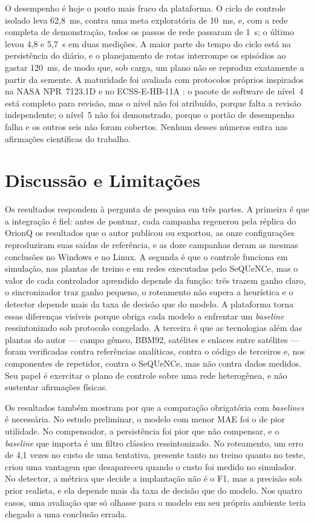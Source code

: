 \documentclass[12pt]{article}
\begin{document}
O desempenho é hoje o ponto mais fraco da plataforma. O ciclo de controle
isolado leva 62,8~ms, contra uma meta exploratória de 10~ms, e, com a rede
completa de demonstração, todos os passos de rede passaram de 1~s; o último levou
4,8 e 5,7~s em duas medições. A maior parte do tempo do ciclo está na
persistência do diário, e o planejamento de rotas interrompe os episódios ao
gastar 120~ms, de modo que, sob carga, um plano não se reproduz exatamente a
partir da semente. A maturidade foi avaliada com protocolos próprios inspirados
na NASA NPR~7123.1D \cite{nasa7123} e no ECSS-E-HB-11A \cite{ecss2017}: o pacote de
software de nível~4 está completo para revisão, mas o nível não foi atribuído,
porque falta a revisão independente; o nível~5 não foi demonstrado, porque o
portão de desempenho falha e os outros seis não foram cobertos. Nenhum desses
números entra nas afirmações científicas do trabalho.

\section{Discussão e Limitações}
\label{sec:discussao}

Os resultados respondem à pergunta de pesquisa em três partes. A primeira é que a
integração é fiel: antes de pontuar, cada campanha regenerou pela réplica do
OrionQ os resultados que o autor publicou ou exportou, as onze configurações
reproduziram suas saídas de referência, e as doze campanhas deram as mesmas
conclusões no Windows e no Linux. A segunda é que o controle funciona em
simulação, nas plantas de treino e em redes executadas pelo SeQUeNCe, mas o valor
de cada controlador aprendido depende da função: três trazem ganho claro, o
sincronizador traz ganho pequeno, o roteamento não supera a heurística e o
detector depende mais da taxa de decisão que do modelo. A plataforma torna essas
diferenças visíveis porque obriga cada modelo a enfrentar um \textit{baseline}
ressintonizado sob protocolo congelado. A terceira é que as tecnologias além das
plantas do autor --- campo gêmeo, BBM92, satélites e enlaces entre satélites ---
foram verificadas contra referências analíticas, contra o código de terceiros e,
nos componentes de repetidor, contra o SeQUeNCe, mas não contra dados medidos.
Seu papel é exercitar o plano de controle sobre uma rede heterogênea, e não
sustentar afirmações físicas.

Os resultados também mostram por que a comparação obrigatória com \textit{baselines}
é necessária. No estudo preliminar, o modelo com menor MAE foi o de pior
utilidade. No compensador, a persistência foi pior que não compensar, e o
\textit{baseline} que importa é um filtro clássico ressintonizado. No roteamento,
um erro de 4,1 vezes no custo de uma tentativa, presente tanto no treino quanto
no teste, criou uma vantagem que desapareceu quando o custo foi medido no
simulador. No detector, a métrica que decide a implantação não é o F1, mas a
precisão sob prior realista, e ela depende mais da taxa de decisão que do
modelo. Nos quatro casos, uma avaliação que só olhasse para o modelo em seu
próprio ambiente teria chegado a uma conclusão errada.
\end{document}
